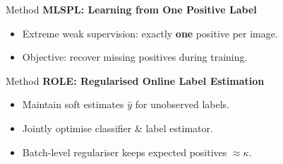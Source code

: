 \begin{frame}{Method}
  \textbf{MLSPL: Learning from One Positive Label}
  \begin{itemize}
    \item Extreme weak supervision: exactly \textbf{one} positive per image.
    \item Objective: recover missing positives during training.
  \end{itemize}
\end{frame}

\begin{frame}{Method}
  \textbf{ROLE: Regularised Online Label Estimation}
  \begin{itemize}
    \item Maintain soft estimates $\hat{y}$ for unobserved labels.
    \item Jointly optimise classifier \& label estimator.
    \item Batch-level regulariser keeps expected positives $\approx \kappa$.
  \end{itemize}
\end{frame}



